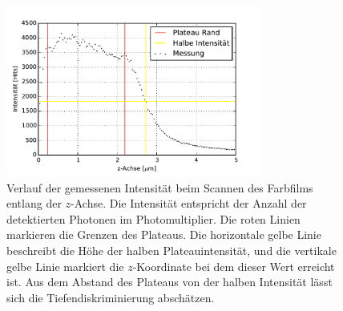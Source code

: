 \begin{figure}
	\centering
	\includegraphics[width=0.75\textwidth]{plots/tiefe.pdf}
	\caption{Verlauf der gemessenen Intensität beim Scannen des Farbfilms entlang der $z$-Achse. Die Intensität entspricht der Anzahl der detektierten Photonen im Photomultiplier.
		Die roten Linien markieren die Grenzen des Plateaus. 
		Die horizontale gelbe Linie beschreibt die Höhe der halben Plateauintensität, und die vertikale gelbe Linie markiert die $z$-Koordinate bei dem dieser Wert erreicht ist.
		Aus dem Abstand des Plateaus von der halben Intensität lässt sich die Tiefendiskriminierung abschätzen.
	}\label{fig:tiefe}
\end{figure}

